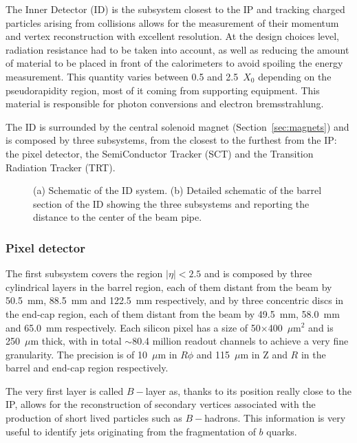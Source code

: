 The Inner Detector (ID) is the subsystem closest to the IP and tracking charged particles arising from collisions allows for 
the measurement of their momentum and vertex reconstruction with excellent resolution. At the design choices level, radiation resistance had to
be taken into account, as well as reducing the amount of material to be placed in front of the calorimeters to avoid spoiling the energy measurement.
This quantity varies between 0.5 and 2.5~$X_0$ depending on the pseudorapidity region, most of it coming from supporting equipment. This material
is responsible for photon conversions and electron bremsstrahlung.

The ID is surrounded by the central solenoid magnet (Section~\ref{sec:magnets}) and is composed by three subsystems, 
from the closest to the furthest from the IP: the pixel detector, the SemiConductor Tracker (SCT) and
the Transition Radiation Tracker (TRT).

\begin{figure}[tb]\begin{center}
	\caption{(a) Schematic of the ID system. (b) Detailed schematic of the barrel section of the ID showing the
        three subsystems and reporting the distance to the center of the beam pipe.}
\end{center}\end{figure}


\subsubsection{Pixel detector}

The first subsystem covers the region $|\eta|<2.5$ and  is composed by three cylindrical layers in the barrel region, each of them distant from the beam by
50.5~mm, 88.5~mm and 122.5~mm respectively, and by three concentric discs in the end-cap region, each of them distant from the beam by
49.5~mm, 58.0~mm and 65.0~mm respectively.
Each silicon pixel has a size of 50$\times$400~$\mu$m$^{2}$ and is 250~$\mu$m thick, 
with in total $\sim$80.4 million readout channels to achieve a very fine granularity.
The precision is of 10~$\mu$m in $R\phi$ and 115~$\mu$m in Z and $R$ in the barrel and end-cap
region respectively.

The very first layer is called $B-$layer as, thanks to its position really close to the IP,
allows for the reconstruction of secondary vertices associated with the production of
 short lived particles such as $B-$hadrons. This information is very useful to identify
jets originating from the fragmentation of $b$ quarks.

